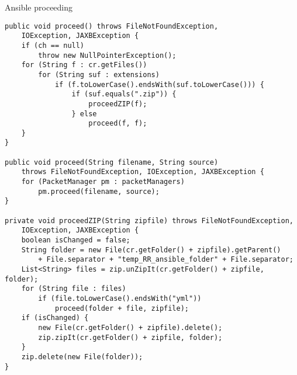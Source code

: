 \begin{Listing}
\caption{Ansible proceeding}
\label{lst:ansible_proceed}
\begin{lstlisting}
public void proceed() throws FileNotFoundException,
	IOException, JAXBException {
	if (ch == null)
		throw new NullPointerException();
	for (String f : cr.getFiles())
		for (String suf : extensions)
			if (f.toLowerCase().endsWith(suf.toLowerCase())) {
				if (suf.equals(".zip")) {
					proceedZIP(f);
				} else
					proceed(f, f);
	}
}

public void proceed(String filename, String source)
	throws FileNotFoundException, IOException, JAXBException {
	for (PacketManager pm : packetManagers)
		pm.proceed(filename, source);
} 

private void proceedZIP(String zipfile) throws FileNotFoundException,
	IOException, JAXBException {
	boolean isChanged = false;
	String folder = new File(cr.getFolder() + zipfile).getParent()
		+ File.separator + "temp_RR_ansible_folder" + File.separator;
	List<String> files = zip.unZipIt(cr.getFolder() + zipfile, folder);
	for (String file : files)
		if (file.toLowerCase().endsWith("yml"))
			proceed(folder + file, zipfile);
	if (isChanged) {
		new File(cr.getFolder() + zipfile).delete();
		zip.zipIt(cr.getFolder() + zipfile, folder);
	}
	zip.delete(new File(folder));
}
\end{lstlisting}
\end{Listing}